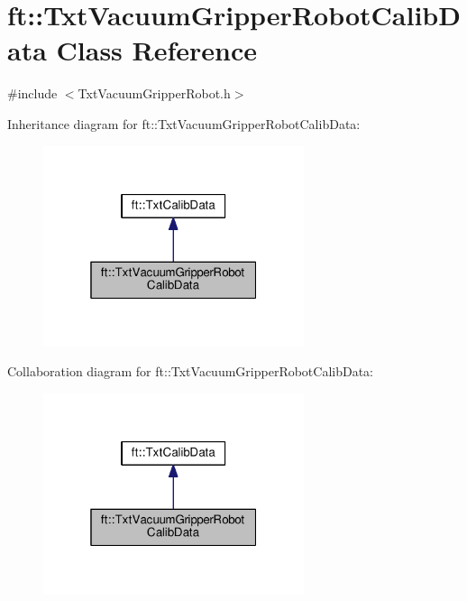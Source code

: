 \hypertarget{classft_1_1_txt_vacuum_gripper_robot_calib_data}{}\section{ft\+:\+:Txt\+Vacuum\+Gripper\+Robot\+Calib\+Data Class Reference}
\label{classft_1_1_txt_vacuum_gripper_robot_calib_data}


{\ttfamily \#include $<$Txt\+Vacuum\+Gripper\+Robot.\+h$>$}



Inheritance diagram for ft\+:\+:Txt\+Vacuum\+Gripper\+Robot\+Calib\+Data\+:
\nopagebreak
\begin{figure}[H]
\begin{center}
\leavevmode
\includegraphics[width=217pt]{classft_1_1_txt_vacuum_gripper_robot_calib_data__inherit__graph}
\end{center}
\end{figure}


Collaboration diagram for ft\+:\+:Txt\+Vacuum\+Gripper\+Robot\+Calib\+Data\+:
\nopagebreak
\begin{figure}[H]
\begin{center}
\leavevmode
\includegraphics[width=217pt]{classft_1_1_txt_vacuum_gripper_robot_calib_data__coll__graph}
\end{center}
\end{figure}
